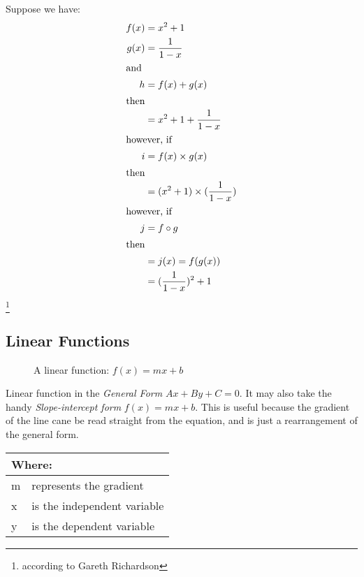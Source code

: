 Suppose we have:
\begin{align}
  f(x) & = x^{2} + 1 \\
  g(x) & = \frac{1}{1-x} \\
  \intertext{and}
  h    & = f(x) + g(x) \\
  \intertext{then}
       & = x^{2} + 1 + \frac{1}{1-x} \\
  \intertext{however, if}
  i    & = f(x) \times g(x) \\
  \intertext{then}
       & = (x^{2} + 1) \times (\frac{1}{1-x}) \\
  \intertext{however, if}
  j    & = f \circ g \\
  \intertext{then}
       & = j(x) = f(g(x)) \\
       & = (\frac{1}{1-x})^{2} + 1
\end{align}
\footnote{according to Gareth Richardson}

%
\clearpage
\subsection{Linear Functions}
\label{sec:LinearFunctions}
\begin{figure}[!hbt]
\label{fig:FuncGraphLinear}
\caption{A linear function: $f(x) = mx + b$}
\end{figure}
%
Linear function in the \emph{General Form} $Ax + By + C= 0$. It may also take
the handy \emph{Slope-intercept form} $ f(x) = mx + b $. This is useful because
the gradient of the line cane be read straight from the equation, and is just
a rearrangement of the general form. 
\begin{table}[!hbt]
\label{tab:PartsOfALinearFunction}
\begin{tabularx}{\linewidth}{| l X |}
  \hline
  \multicolumn{2}{|l|}{Where:} \\
  \hline \hline
  m & represents the gradient\\
  x & is the independent variable\\
  y & is the dependent variable\\
\hline
\end{tabularx}
\end{table}

